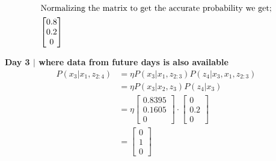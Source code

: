 \documentclass[answers]{exam}
\begin{document}
\begin{questions}
\begin{parts}
\begin{solution}
            \begin{align*}
                \intertext{Normalizing the matrix to get the accurate probability we get;}
                \begin{bmatrix} 0.8 \\ 0.2 \\ 0 \end{bmatrix}
            \end{align*}

            \textbf{Day 3 $\mid$ where data from future days is also available}
            \begin{align*}
                P(x_3 | x_1, z_{2:4}) & = \eta P(x_3 | x_1, z_{2:3})P(z_4 | x_3, x_1, z_{2:3}) \\
                                      & = \eta P(x_3 | x_2, z_3)P(z_4 | x_3)                   \\
                                      & = \eta \begin{bmatrix}
                                                   0.8395 \\
                                                   0.1605 \\
                                                   0
                                               \end{bmatrix} \cdot \begin{bmatrix}
                                                                       0   \\
                                                                       0.2 \\
                                                                       0
                                                                   \end{bmatrix}              \\
                                      & = \begin{bmatrix}
                                              0 \\
                                              1 \\
                                              0
                                          \end{bmatrix}
            \end{align*}


\end{solution}
\end{parts}
\end{questions}
\end{document}
